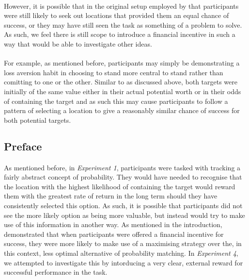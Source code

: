 \documentclass[12pt]{article}
\begin{document}
\paragraph{} However, it is possible that in the original setup employed by \cite{morvan2012human} that participants were still likely to seek out locations that provided them an equal chance of success, or they may have still seen the task as something of a problem to solve. As such, we feel there is still scope to introduce a financial incentive in such a way that would be able to investigate other ideas. 

\paragraph{} For example, as mentioned before, participants may simply be demonstrating a loss aversion habit in choosing to stand more central to stand rather than comitting to one or the other. Similar to as discussed above, both targets were initially of the same value either in their actual potential worth \citep{morvan2012human} or in their odds of containing the target \citep{clarke2015failure} and as such this may cause participants to follow a pattern of selecting a location to give a reasonably similar chance of success for both potential targets. 

\subsection*{Preface}
\paragraph{} As mentioned before, in \textit{Experiment 1}, participants were tasked with tracking a fairly abstract concept of probability. They would have needed to recognise that the location with the highest likelihood of containing the target would reward them with the greatest rate of return in the long term should they have consistently selected this option. As such, it is possible that participants did not see the more likely option as being more valuable, but instead would try to make use of this information in another way. As mentioned in the introduction, \cite{Goodnow1955} demonstrated that when participants were offered a financial incentive for success, they were more likely to make use of a maximising strategy over the, in this context, less optimal alternative of probability matching. In \textit{Experiment 4}, we attempted to investigate this by intorducing a very clear, external reward for successful performance in the task. 
\end{document}
